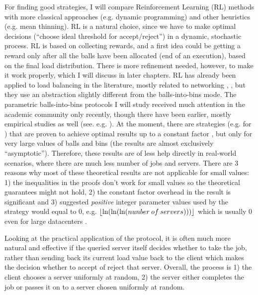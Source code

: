 For finding good strategies, I will compare Reinforcement Learning (RL) methods with more classical approaches (e.g. dynamic programming) and other heuristics (e.g. mean thinning). RL is a natural choice, since we have to make optimal decisions (``choose ideal threshold for accept/reject'') in a dynamic, stochastic process. RL is based on collecting rewards, and a first idea could be getting a reward only after all the balls have been allocated (end of an execution), based on the final load distribution. There is more refinement needed, however, to make it work properly, which I will discuss in later chapters. RL has already been applied to load balancing in the literature, mostly related to networking \cite{attiah2020RLcellular}, \cite{yeo2021controller}, but they use an abstraction slightly different from the balls-into-bins mode. The parametric balls-into-bins protocols I will study received much attention in the academic community only recently, though there have been earlier, mostly empirical studies as well (see. e.g. \cite{derek1986twothinningfirstattempt}). At the moment, there are strategies (e.g. for \TwoThinning) that are proven to achieve optimal results up to a constant factor \cite{feldheim2021thinning}, but only for very large values of balls and bins (the results are almost exclusively ``asymptotic''). Therefore, these results are of less help directly in real-world scenarios, where there are much less number of jobs and servers. There are $3$ reasons why most of these theoretical results are not applicable for small values: 1) the inequalities in the proofs don't work for small values \cite{feldheim2021longtermthinning} so the theoretical guarantees might not hold, 2) the constant factor overhead in the result is significant and 3) suggested \textit{positive} integer parameter values used by the strategy would equal to $0$, e.g. $\lfloor\ln(\ln(\ln(nunber\: of \: servers)))\rfloor$ which is usually $0$ even for large datacenters \cite{uzaman2019datacentersize}.



Looking at the practical application of the \TwoThinning protocol, it is often much more natural and effective if the queried server itself decides whether to take the job, rather than sending back its current load value back to the client which makes the decision whether to accept of reject that server.  Overall, the process is 1) the client chooses a server uniformly at random, 2) the server either completes the job or passes it on to a server chosen uniformly at random.

